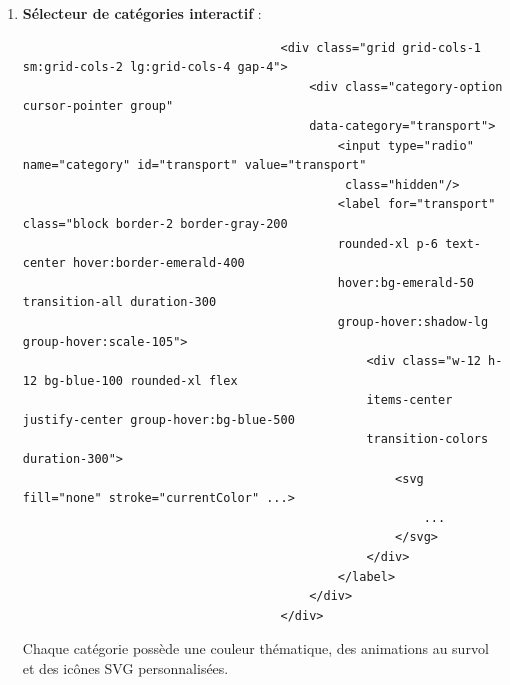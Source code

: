 \documentclass[a4paper,11pt]{article}
\begin{document}
                    \begin{enumerate}
                        \item \textbf{Sélecteur de catégories interactif} :
                            \begin{tcolorbox}[colback=lightgray!6, colframe=black, left=-70mm, right=5mm, top=2mm, bottom=0mm, boxrule=0.1mm]
                                \begin{verbatim}
                                    <div class="grid grid-cols-1 sm:grid-cols-2 lg:grid-cols-4 gap-4">
                                        <div class="category-option cursor-pointer group" 
                                        data-category="transport">
                                            <input type="radio" name="category" id="transport" value="transport"
                                             class="hidden"/>
                                            <label for="transport" class="block border-2 border-gray-200 
                                            rounded-xl p-6 text-center hover:border-emerald-400 
                                            hover:bg-emerald-50 transition-all duration-300 
                                            group-hover:shadow-lg group-hover:scale-105">
                                                <div class="w-12 h-12 bg-blue-100 rounded-xl flex 
                                                items-center justify-center group-hover:bg-blue-500 
                                                transition-colors duration-300">
                                                    <svg fill="none" stroke="currentColor" ...>
                                                        ...
                                                    </svg>
                                                </div>
                                            </label>
                                        </div>
                                    </div>
                                \end{verbatim}
                            \end{tcolorbox}

                            \noindent Chaque catégorie possède une couleur thématique, des animations au survol et des icônes SVG personnalisées.


\end{enumerate}
\end{document}
